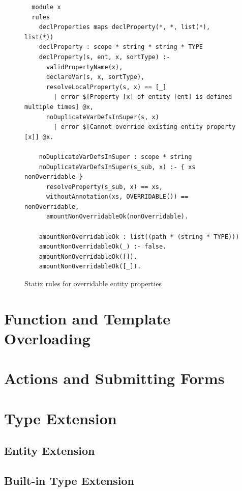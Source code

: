       \begin{figure}
        \begin{verbatim}
  module x
  rules
    declProperties maps declProperty(*, *, list(*), list(*))
    declProperty : scope * string * string * TYPE
    declProperty(s, ent, x, sortType) :-
      validPropertyName(x),
      declareVar(s, x, sortType),
      resolveLocalProperty(s, x) == [_]
        | error $[Property [x] of entity [ent] is defined multiple times] @x,
      noDuplicateVarDefsInSuper(s, x)
        | error $[Cannot override existing entity property [x]] @x.

    noDuplicateVarDefsInSuper : scope * string
    noDuplicateVarDefsInSuper(s_sub, x) :- { xs nonOverridable }
      resolveProperty(s_sub, x) == xs,
      withoutAnnotation(xs, OVERRIDABLE()) == nonOverridable,
      amountNonOverridableOk(nonOverridable).

    amountNonOverridableOk : list((path * (string * TYPE)))
    amountNonOverridableOk(_) :- false.
    amountNonOverridableOk([]).
    amountNonOverridableOk([_]).
        \end{verbatim}
        \caption{\label{fig:overridable-properties-statix}Statix rules for overridable entity properties}
      \end{figure}

  \section{\label{sec:function-template-overloading}Function and Template Overloading}

  \section{\label{sec:actions-and-submitting-forms}Actions and Submitting Forms}

  \section{\label{sec:type-extension}Type Extension}

    \subsection{\label{subsec:entity-extension}Entity Extension}

    \subsection{\label{subsec:built-in-extension}Built-in Type Extension}

